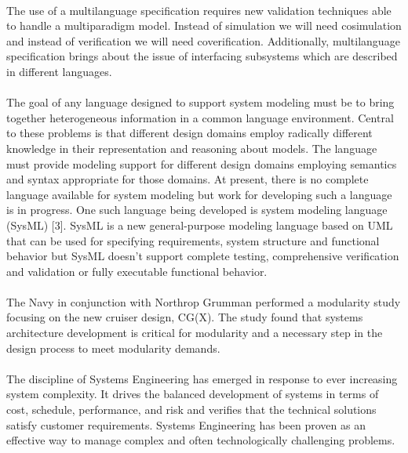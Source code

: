 \documentclass[a4paper,12pt,twoside]{report}
\begin{document}
			\paragraph{}{The use of a multilanguage specification requires new validation techniques able to handle a multiparadigm model. Instead of simulation we will need cosimulation and instead of verification we will need coverification. Additionally, multilanguage specification brings about the issue of interfacing subsystems which are described in different languages. \cite{SMWirelessSensorNetwork}
			}
		
			\paragraph{} {The goal of any language designed to support system modeling must be to bring together heterogeneous information in a common language environment. Central to these problems is that different design domains employ radically different knowledge in their representation and reasoning about models. The language must provide modeling support for different design domains employing semantics and syntax appropriate for those domains. At present, there is no complete language available for system modeling but work for developing such a language is in progress. One such language being developed is system modeling language (SysML) [3]. SysML is a new general-purpose modeling language based on UML that can be used for specifying requirements, system structure and functional behavior but SysML doesn’t support complete testing, comprehensive verification and validation or fully executable functional behavior. \cite{SMWirelessSensorNetwork}
			}
			
			\paragraph{} {The Navy in conjunction with Northrop Grumman performed a modularity study focusing on the new cruiser design, CG(X). The study found that systems architecture development is critical for modularity and a necessary step in the design process to meet modularity demands. \cite{MBSESystemArchitectureNavalShipDesign}
			}
			
			\paragraph{} {The discipline of Systems Engineering has emerged in response to ever increasing system complexity. It drives the balanced development of systems in terms of cost, schedule, performance, and risk and verifies that the technical solutions satisfy customer requirements. Systems Engineering has been proven as an effective way to manage complex and often technologically challenging problems. \cite{MBSESystemArchitectureNavalShipDesign}
			}
\end{document}
